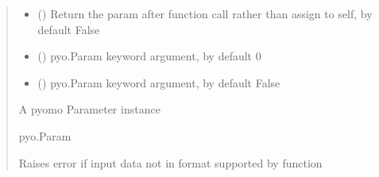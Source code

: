 \documentclass[letterpaper,10pt,english]{sphinxmanual}
\begin{document}
\begin{fulllineitems}
\begin{fulllineitems}
\begin{quote}
\begin{description}
\begin{itemize}
\item {} 
\sphinxAtStartPar
{} (\sphinxstyleliteralemphasis{\sphinxupquote{ | }}\sphinxstyleliteralemphasis{\sphinxupquote{, }}) \textendash{} Return the param after function call rather than assign to self, by default False

\item {} 
\sphinxAtStartPar
{} (\sphinxstyleliteralemphasis{\sphinxupquote{ | }}\sphinxstyleliteralemphasis{\sphinxupquote{, }}) \textendash{} pyo.Param keyword argument, by default 0

\item {} 
\sphinxAtStartPar
{} (\sphinxstyleliteralemphasis{\sphinxupquote{ | }}\sphinxstyleliteralemphasis{\sphinxupquote{, }}) \textendash{} pyo.Param keyword argument, by default False

\end{itemize}

\sphinxAtStartPar
A pyomo Parameter instance

\sphinxAtStartPar
pyo.Param

\sphinxAtStartPar
{} \textendash{} Raises error if input data not in format supported by function

\end{description}\end{quote}

\end{fulllineitems}



\end{fulllineitems}
\end{document}
